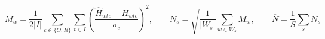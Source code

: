 \documentclass[12pt]{article}
\begin{document}
\fontsize{23}{29}\selectfont\[
M_w=\frac{1}{2|I|}\sum_{c\in\{O,R\}}\sum_{t\in I}\left(\frac{\widehat H_{wtc}-H_{wtc}}{\sigma_c}\right)^2,\qquad N_s=\sqrt{\frac{1}{|W_s|}\sum_{w\in W_s}M_w},\qquad \overline N=\frac1S\sum_s N_s
\]
\end{document}
